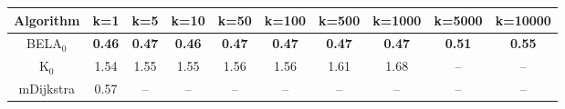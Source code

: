 \begin{tabular}{c|ccccccccc}\toprule
Algorithm & k=1 & k=5 & k=10 & k=50 & k=100 & k=500 & k=1000 & k=5000 & k=10000 \\ \midrule
BELA$_0$ & \textbf{0.46} & \textbf{0.47} & \textbf{0.46} & \textbf{0.47} & \textbf{0.47} & \textbf{0.47} & \textbf{0.47} & \textbf{0.51} & \textbf{0.55} \\
K$_0$ & 1.54 & 1.55 & 1.55 & 1.56 & 1.56 & 1.61 & 1.68 & -- & -- \\
mDijkstra & 0.57 & -- & -- & -- & -- & -- & -- & -- & -- \\ \bottomrule 
\end{tabular}

